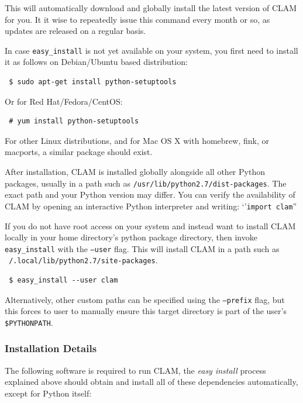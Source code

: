 \documentclass[a4paper,12pt]{report}
\begin{document}
This will automatically download and globally install the latest version of
CLAM for you. It it wise to repeatedly issue this command every month or so, as
updates are released on a regular basis.

In case \texttt{easy\_install} is not yet available on your system, you first need to
install it as follows on Debian/Ubuntu based distribution: 

\begin{verbatim} $ sudo apt-get install python-setuptools \end{verbatim}

Or for Red Hat/Fedora/CentOS:

\begin{verbatim} # yum install python-setuptools \end{verbatim}

For other Linux distributions, and for Mac OS X with homebrew, fink, or
macports, a similar package should exist. 

After installation, CLAM is installed globally alongside all other Python
packages, usually in a path such as \texttt{/usr/lib/python2.7/dist-packages}.
The exact path and your Python version may differ. You can verify the
availability of CLAM by opening an interactive Python interpreter and writing:
`'\texttt{import clam}''

If you do not have root access on your system and instead want to install CLAM
locally in your home directory's python package directory, then invoke
\texttt{easy\_install} with the \texttt{--user} flag. This will install CLAM in
a path such as \texttt{~/.local/lib/python2.7/site-packages}.

\begin{verbatim} $ easy_install --user clam \end{verbatim}

Alternatively, other custom paths can be specified using the \texttt{--prefix}
flag, but this forces to user to manually ensure this target directory is part
of the user's \texttt{\$PYTHONPATH}.

\subsubsection{Installation Details} 
 
The following software is required to run CLAM, the \emph{easy install} process
explained above should obtain and install all of these dependencies
automatically, except for Python itself:
\end{document}
